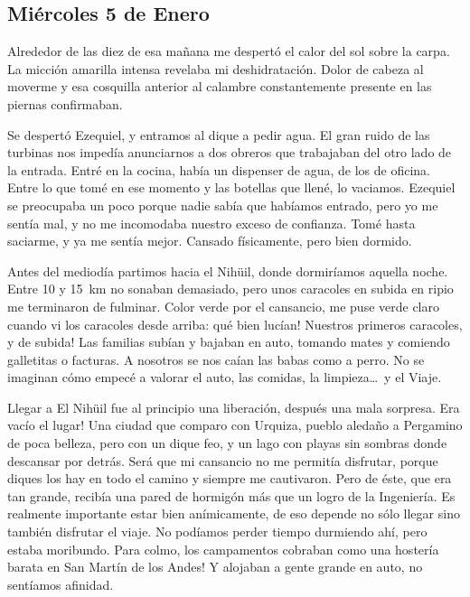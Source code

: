 \subsection*{Mi\'ercoles 5 de Enero}

Alrededor de las diez de esa ma\~nana me despert\'o el calor del sol sobre la
carpa. La micci\'on amarilla intensa revelaba mi deshidrataci\'on. Dolor de
cabeza al moverme y esa cosquilla anterior al calambre constantemente presente
en las piernas confirmaban.

Se despert\'o Ezequiel, y entramos al dique a pedir agua. El gran ruido de las
turbinas nos imped\'ia anunciarnos a dos obreros que trabajaban del otro lado de
la entrada. Entr\'e en la cocina, hab\'ia un dispenser de agua, de los de
oficina. Entre lo que tom\'e en ese momento y las botellas que llen\'e, lo
vaciamos. Ezequiel se preocupaba un poco porque nadie sab\'ia que hab\'iamos
entrado, pero yo me sent\'ia mal, y no me incomodaba nuestro exceso de
confianza. Tom\'e hasta saciarme, y ya me sent\'ia mejor. Cansado f\'isicamente,
pero bien dormido.

Antes del mediod\'ia partimos hacia el Nih\"uil, donde dormir\'iamos aquella
noche. Entre 10 y 15~km no sonaban demasiado, pero unos caracoles en subida en
ripio me terminaron de fulminar. Color verde por el cansancio, me puse verde
claro cuando vi los caracoles desde arriba: \textexclamdown qu\'e bien luc\'ian!
Nuestros primeros caracoles, \textexclamdown y de subida! Las familias sub\'ian
y bajaban en auto, tomando mates y comiendo galletitas o facturas. A nosotros se
nos ca\'ian las babas como a perro. No se imaginan c\'omo empec\'e a valorar el
auto, las comidas, la limpieza\ldots\ y el Viaje.

Llegar a El Nih\"uil fue al principio una liberaci\'on, despu\'es una mala
sorpresa. \textexclamdown Era vac\'io el lugar! Una ciudad que comparo con
Urquiza, pueblo aleda\~no a Pergamino de poca belleza, pero con un dique feo, y
un lago con playas sin sombras donde descansar por detr\'as. Ser\'a que mi
cansancio no me permit\'ia disfrutar, porque diques los hay en todo el camino y
siempre me cautivaron. Pero de \'este, que era tan grande, recib\'ia una pared
de hormig\'on m\'as que un logro de la Ingenier\'ia. Es realmente importante
estar bien an\'imicamente, de eso depende no s\'olo llegar sino tambi\'en
disfrutar el viaje. No pod\'iamos perder tiempo durmiendo ah\'i, pero estaba
moribundo. \textexclamdown Para colmo, los campamentos cobraban como una
hoster\'ia barata en San Mart\'in de los Andes! Y alojaban a gente grande en
auto, no sent\'iamos afinidad.

